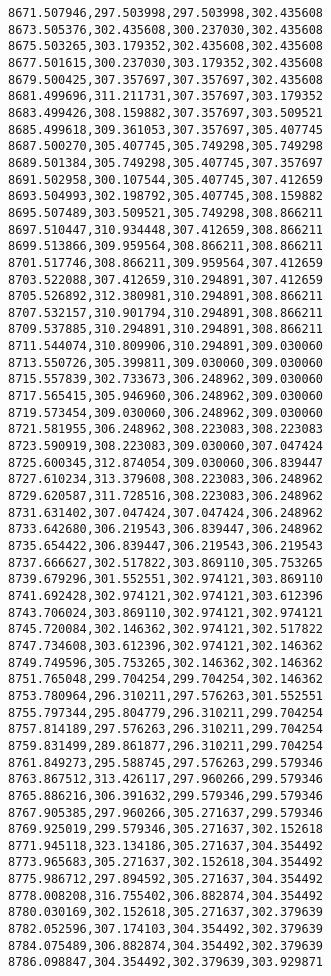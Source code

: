 \documentclass[11pt]{article}
\begin{document}
\begin{Verbatim}[commandchars=\\\{\}]
8671.507946,297.503998,297.503998,302.435608
8673.505376,302.435608,300.237030,302.435608
8675.503265,303.179352,302.435608,302.435608
8677.501615,300.237030,303.179352,302.435608
8679.500425,307.357697,307.357697,302.435608
8681.499696,311.211731,307.357697,303.179352
8683.499426,308.159882,307.357697,303.509521
8685.499618,309.361053,307.357697,305.407745
8687.500270,305.407745,305.749298,305.749298
8689.501384,305.749298,305.407745,307.357697
8691.502958,300.107544,305.407745,307.412659
8693.504993,302.198792,305.407745,308.159882
8695.507489,303.509521,305.749298,308.866211
8697.510447,310.934448,307.412659,308.866211
8699.513866,309.959564,308.866211,308.866211
8701.517746,308.866211,309.959564,307.412659
8703.522088,307.412659,310.294891,307.412659
8705.526892,312.380981,310.294891,308.866211
8707.532157,310.901794,310.294891,308.866211
8709.537885,310.294891,310.294891,308.866211
8711.544074,310.809906,310.294891,309.030060
8713.550726,305.399811,309.030060,309.030060
8715.557839,302.733673,306.248962,309.030060
8717.565415,305.946960,306.248962,309.030060
8719.573454,309.030060,306.248962,309.030060
8721.581955,306.248962,308.223083,308.223083
8723.590919,308.223083,309.030060,307.047424
8725.600345,312.874054,309.030060,306.839447
8727.610234,313.379608,308.223083,306.248962
8729.620587,311.728516,308.223083,306.248962
8731.631402,307.047424,307.047424,306.248962
8733.642680,306.219543,306.839447,306.248962
8735.654422,306.839447,306.219543,306.219543
8737.666627,302.517822,303.869110,305.753265
8739.679296,301.552551,302.974121,303.869110
8741.692428,302.974121,302.974121,303.612396
8743.706024,303.869110,302.974121,302.974121
8745.720084,302.146362,302.974121,302.517822
8747.734608,303.612396,302.974121,302.146362
8749.749596,305.753265,302.146362,302.146362
8751.765048,299.704254,299.704254,302.146362
8753.780964,296.310211,297.576263,301.552551
8755.797344,295.804779,296.310211,299.704254
8757.814189,297.576263,296.310211,299.704254
8759.831499,289.861877,296.310211,299.704254
8761.849273,295.588745,297.576263,299.579346
8763.867512,313.426117,297.960266,299.579346
8765.886216,306.391632,299.579346,299.579346
8767.905385,297.960266,305.271637,299.579346
8769.925019,299.579346,305.271637,302.152618
8771.945118,323.134186,305.271637,304.354492
8773.965683,305.271637,302.152618,304.354492
8775.986712,297.894592,305.271637,304.354492
8778.008208,316.755402,306.882874,304.354492
8780.030169,302.152618,305.271637,302.379639
8782.052596,307.174103,304.354492,302.379639
8784.075489,306.882874,304.354492,302.379639
8786.098847,304.354492,302.379639,303.929871

\end{Verbatim}
\end{document}

